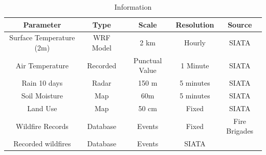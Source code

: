 \begin{table}[!h]
\label{Tab:info_all}
\caption{Information}
\begin{tabular}{| c | c | c | c | c |}
\hline
\textbf{Parameter} & \textbf{Type} & \textbf{Scale} & \textbf{Resolution} & \textbf{Source} \\
\hline

Surface Temperature  (2m) & WRF Model & 2 km & Hourly & SIATA \\ \hline
Air Temperature  & Recorded & Punctual Value  & 1 Minute & SIATA \\ \hline
Rain 10 days & Radar  & 150 m & 5 minutes & SIATA \\ \hline
Soil Moisture & Map & 60m & 5 minutes & SIATA \\ \hline
Land Use & Map & 50 cm & Fixed & SIATA \\ \hline
Wildfire Records & Database &  Events & Fixed & Fire Brigades\\
Recorded wildfires & Database & Events & SIATA \\
\hline

\end{tabular}
\end{table}